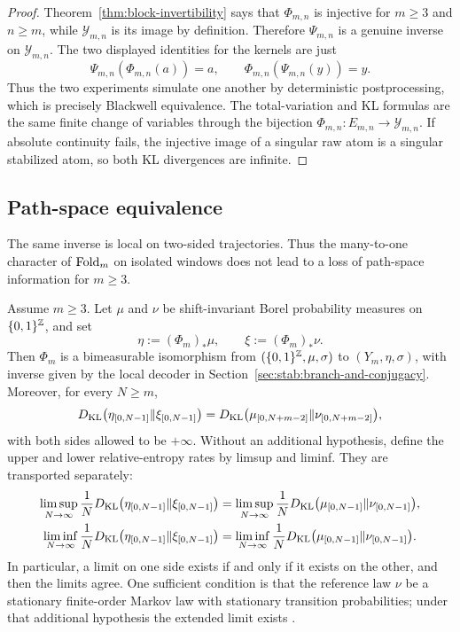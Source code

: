 \begin{proof}
Theorem~\ref{thm:block-invertibility} says that $\Phi_{m,n}$ is injective for
$m\ge3$ and $n\ge m$, while $\mathcal Y_{m,n}$ is its image by definition.
Therefore $\Psi_{m,n}$ is a genuine inverse on $\mathcal Y_{m,n}$.  The two
displayed identities for the kernels are just
\[
\Psi_{m,n}(\Phi_{m,n}(a))=a,\qquad
\Phi_{m,n}(\Psi_{m,n}(y))=y.
\]
Thus the two experiments simulate one another by deterministic postprocessing,
which is precisely Blackwell equivalence. The total-variation and KL formulas
are the same finite change of variables through the bijection
$\Phi_{m,n}:E_{m,n}\to\mathcal Y_{m,n}$. If absolute continuity fails, the
injective image of a singular raw atom is a singular stabilized atom, so both
KL divergences are infinite.
\end{proof}

\subsection{Path-space equivalence}

The same inverse is local on two-sided trajectories. Thus the many-to-one
character of $\mathrm{Fold}_m$ on isolated windows does not lead to a loss of
path-space information for $m\ge3$.

\begin{corollary}\label{cor:path-space-divergence}
Assume $m\ge3$.  Let $\mu$ and $\nu$ be shift-invariant Borel probability
measures on $\{0,1\}^{\mathbb{Z}}$, and set
\[
\eta:=(\Phi_m)_*\mu,\qquad \xi:=(\Phi_m)_*\nu .
\]
Then $\Phi_m$ is a bimeasurable isomorphism from
$(\{0,1\}^{\mathbb{Z}},\mu,\sigma)$ to $(Y_m,\eta,\sigma)$, with inverse given by the
local decoder in Section~\ref{sec:stab:branch-and-conjugacy}.  Moreover, for every
$N\ge m$,
\[
D_{\mathrm{KL}}\bigl(\eta_{[0,N-1]}\|\xi_{[0,N-1]}\bigr)
=
D_{\mathrm{KL}}\bigl(\mu_{[0,N+m-2]}\|\nu_{[0,N+m-2]}\bigr),
\]
with both sides allowed to be $+\infty$.  Without an additional hypothesis,
define the upper and lower relative-entropy rates by limsup and liminf.  They
are transported separately:
\begin{align*}
\limsup_{N\to\infty}\frac1N
D_{\mathrm{KL}}\bigl(\eta_{[0,N-1]}\|\xi_{[0,N-1]}\bigr)
&=
\limsup_{N\to\infty}\frac1N
D_{\mathrm{KL}}\bigl(\mu_{[0,N-1]}\|\nu_{[0,N-1]}\bigr),\\
\liminf_{N\to\infty}\frac1N
D_{\mathrm{KL}}\bigl(\eta_{[0,N-1]}\|\xi_{[0,N-1]}\bigr)
&=
\liminf_{N\to\infty}\frac1N
D_{\mathrm{KL}}\bigl(\mu_{[0,N-1]}\|\nu_{[0,N-1]}\bigr).
\end{align*}
In particular, a limit on one side exists if and only if it exists on the
other, and then the limits agree.  One sufficient condition is that the
reference law $\nu$ be a stationary finite-order Markov law with stationary
transition probabilities; under that additional hypothesis the extended
limit exists \cite[Chapter~8]{Gray2011}.
\end{corollary}

